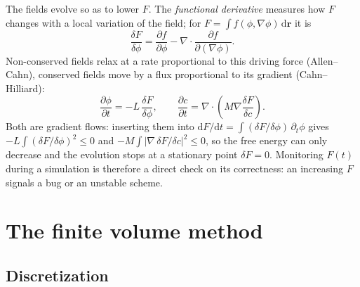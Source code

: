 \documentclass[11pt,a4paper]{article}
\numberwithin{equation}{section}
\theoremstyle{remark}
\newcommand{\fd}[2]{\frac{\delta #1}{\delta #2}}
\begin{document}
The fields evolve so as to lower $F$. The \emph{functional derivative} measures how $F$ changes with a
local variation of the field; for $F = \int f(\phi,\nabla\phi)\,\mathrm{d}\bm{r}$ it is
\begin{equation}\label{eq:fd}
  \fd{F}{\phi} = \frac{\partial f}{\partial\phi} - \nabla\cdot\frac{\partial f}{\partial(\nabla\phi)}.
\end{equation}
Non-conserved fields relax at a rate proportional to this driving force (Allen--Cahn), conserved
fields move by a flux proportional to its gradient (Cahn--Hilliard):
\begin{equation}\label{eq:ac-ch}
  \frac{\partial\phi}{\partial t} = -L\,\fd{F}{\phi},
  \qquad
  \frac{\partial c}{\partial t} = \nabla\cdot\left(M\nabla\fd{F}{c}\right).
\end{equation}
Both are gradient flows: inserting them into $\mathrm{d}F/\mathrm{d}t = \int(\delta F/\delta\phi)\,
\partial_t\phi$ gives $-L\int(\delta F/\delta\phi)^2 \le 0$ and
$-M\int|\nabla\,\delta F/\delta c|^2 \le 0$, so the free energy can only decrease and the evolution
stops at a stationary point $\delta F = 0$. Monitoring $F(t)$ during a simulation is therefore a
direct check on its correctness: an increasing $F$ signals a bug or an unstable scheme.

\section{The finite volume method}\label{sec:fvm}

\subsection{Discretization}\label{sec:fvdisc}
\end{document}
